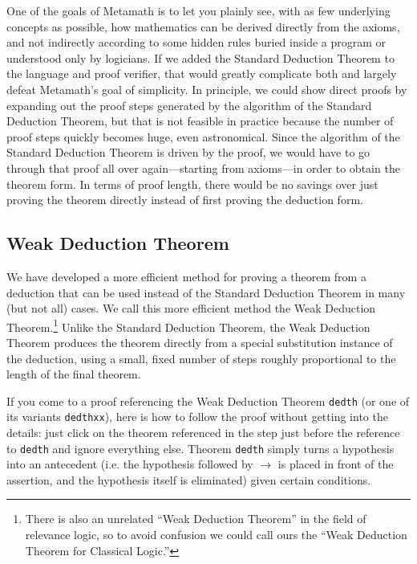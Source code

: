 One of the goals of Metamath is to let you plainly see, with as few
underlying concepts as possible, how mathematics can be derived directly
from the axioms, and not indirectly according to some hidden rules
buried inside a program or understood only by logicians. If we added
the Standard Deduction Theorem to the language and proof verifier,
that would greatly complicate both and largely defeat Metamath's goal
of simplicity. In principle, we could show direct proofs by expanding
out the proof steps generated by the algorithm of the Standard Deduction
Theorem, but that is not feasible in practice because the number of proof
steps quickly becomes huge, even astronomical.
Since the algorithm of the Standard Deduction Theorem is driven by the proof,
we would have to go through that proof
all over again---starting from axioms---in order to obtain the theorem form.
In terms of proof length, there would be no savings over just
proving the theorem directly instead of first proving the deduction form.

\subsection{Weak Deduction Theorem}\label{weakdeductiontheorem}

We have developed
a more efficient method for proving a theorem from a deduction
that can be used instead of the Standard Deduction Theorem
in many (but not all) cases.
We call this more efficient method the
Weak Deduction Theorem.\footnote{
There is also an unrelated ``Weak Deduction Theorem''
in the field of relevance logic, so to avoid confusion we could call
ours the ``Weak Deduction Theorem for Classical Logic.''}
Unlike the Standard Deduction Theorem, the Weak Deduction Theorem produces the
theorem directly from a special substitution instance of the deduction,
using a small, fixed number of steps roughly proportional to the length
of the final theorem.

If you come to a proof referencing the Weak Deduction Theorem
\texttt{dedth} (or one of its variants \texttt{dedthxx}),
here is how to follow the proof without getting into the details:
just click on the theorem referenced in the step
just before the reference to \texttt{dedth} and ignore everything else.
Theorem \texttt{dedth} simply turns a hypothesis into an antecedent
(i.e. the hypothesis followed by $\rightarrow$
is placed in front of the assertion, and the hypothesis
itself is eliminated) given certain conditions.


